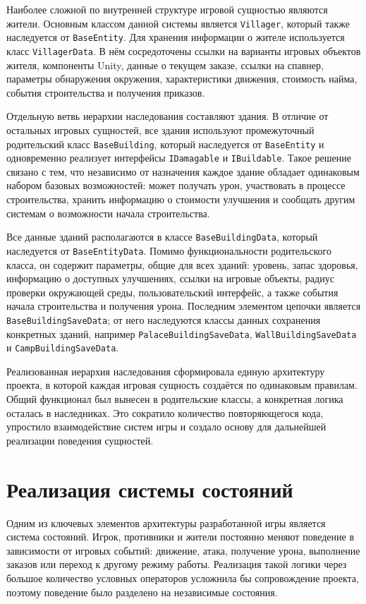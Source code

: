 \documentclass[a4paper,12pt]{report}
\begin{document}
Наиболее сложной по внутренней структуре игровой сущностью являются жители. Основным классом данной системы является \texttt{Villager}, который также наследуется от \texttt{BaseEntity}. Для хранения информации о жителе используется класс \texttt{VillagerData}. В нём сосредоточены ссылки на варианты игровых объектов жителя, компоненты Unity, данные о текущем заказе, ссылки на спавнер, параметры обнаружения окружения, характеристики движения, стоимость найма, события строительства и получения приказов.

Отдельную ветвь иерархии наследования составляют здания. В отличие от остальных игровых сущностей, все здания используют промежуточный родительский класс \texttt{BaseBuilding}, который наследуется от \texttt{BaseEntity} и одновременно реализует интерфейсы \texttt{IDamagable} и \texttt{IBuildable}. Такое решение связано с тем, что независимо от назначения каждое здание обладает одинаковым набором базовых возможностей: может получать урон, участвовать в процессе строительства, хранить информацию о стоимости улучшения и сообщать другим системам о возможности начала строительства.

Все данные зданий располагаются в классе \texttt{BaseBuildingData}, который наследуется от \texttt{BaseEntityData}. Помимо функциональности родительского класса, он содержит параметры, общие для всех зданий: уровень, запас здоровья, информацию о доступных улучшениях, ссылки на игровые объекты, радиус проверки окружающей среды, пользовательский интерфейс, а также события начала строительства и получения урона. Последним элементом цепочки является \texttt{BaseBuildingSaveData}; от него наследуются классы данных сохранения конкретных зданий, например \texttt{PalaceBuildingSaveData}, \texttt{WallBuildingSaveData} и \texttt{CampBuildingSaveData}.

Реализованная иерархия наследования сформировала единую архитектуру проекта, в которой каждая игровая сущность создаётся по одинаковым правилам. Общий функционал был вынесен в родительские классы, а конкретная логика осталась в наследниках. Это сократило количество повторяющегося кода, упростило взаимодействие систем игры и создало основу для дальнейшей реализации поведения сущностей.

\section{Реализация системы состояний}

Одним из ключевых элементов архитектуры разработанной игры является система состояний. Игрок, противники и жители постоянно меняют поведение в зависимости от игровых событий: движение, атака, получение урона, выполнение заказов или переход к другому режиму работы. Реализация такой логики через большое количество условных операторов усложнила бы сопровождение проекта, поэтому поведение было разделено на независимые состояния.
\end{document}
